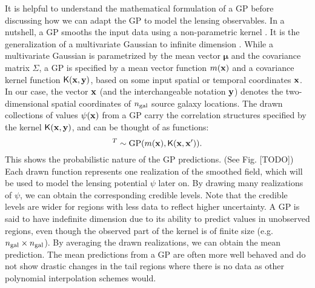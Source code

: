 It is helpful to understand the mathematical formulation of a GP 
before discussing how we can adapt the GP to model the lensing observables. 
In a nutshell, a GP smooths the input data using a non-parametric kernel
\citep{Hastie1990}. 
It is the generalization of a multivariate Gaussian 
to infinite dimension \citep{Rasmussen2006}. 
While a multivariate Gaussian is parametrized by  
the mean vector $\mathbf{\mu}$ and the covariance matrix $\Sigma$, 
a GP is specified by a mean vector function $m(\mathbf{x})$ and a
covariance kernel function $\mathsf{K}(\mathbf{x}, \mathbf{y})$, based on some input spatial or
temporal coordinates $\mathbf{x}$. In our case, the vector $\mathbf{x}$ (and the
interchangeable notation $\mathbf{y}$) denotes the
two-dimensional spatial coordinates of $n_{\rm gal}$ source galaxy locations. 
The drawn collections of values $\psi(\mathbf{x})$ from a GP carry the correlation structures
specified by the kernel $\mathsf{K}(\mathbf{x}, \mathbf{y})$, and can be thought of as
functions: 
\begin{equation}
		[\psi_1(\xv), \psi_2(\xv) \ldots, \psi_m(\xv) ]^T \sim \gp(m(\xv), \kerngp(\xv, \xv')).
		\label{eq:GP}
\end{equation}
This shows the probabilistic nature of the GP predictions.
(See Fig. [TODO])
Each drawn function represents one realization of the smoothed
field, which will be used to model the lensing potential $\psi$ later on. 
By drawing many realizations of $\psi$, we can obtain the
corresponding credible levels.
Note that the credible levels are wider for regions with less data to reflect
higher uncertainty. A GP is said to have indefinite dimension due to its ability to
predict values in unobserved regions, even though the 
observed part of the kernel is of finite size (e.g. $n_{\rm gal} \times n_{\rm gal}$). 
By averaging the drawn realizations, we can
obtain the mean prediction. The mean predictions from a GP are
often more well behaved and do not show drastic changes 
in the tail regions where there is no data as other polynomial interpolation schemes 
would.  

